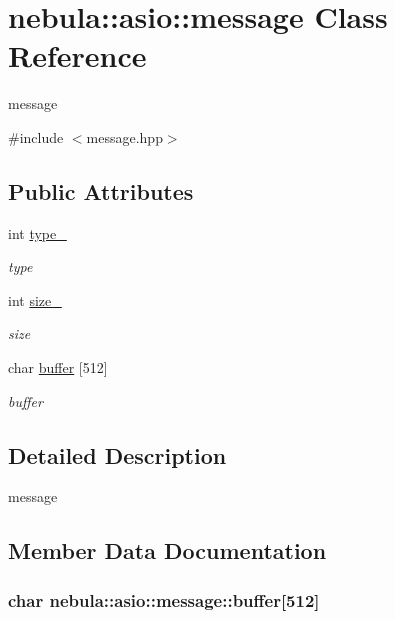 \hypertarget{classnebula_1_1asio_1_1message}{
\section{nebula::asio::message Class Reference}
\label{classnebula_1_1asio_1_1message}
}


message  


{\ttfamily \#include $<$message.hpp$>$}\subsection*{Public Attributes}
\begin{DoxyCompactItemize}
\item 
int \hyperlink{classnebula_1_1asio_1_1message_a3eb27509e00e7825ab9f4c83557725f3}{type\_\-}
\begin{DoxyCompactList}\small\item\em type \item\end{DoxyCompactList}\item 
int \hyperlink{classnebula_1_1asio_1_1message_a9ac3a43a791dc33d15ca5395117080a1}{size\_\-}
\begin{DoxyCompactList}\small\item\em size \item\end{DoxyCompactList}\item 
char \hyperlink{classnebula_1_1asio_1_1message_a7592f88eaf3e851e82d68acba9e8efd2}{buffer} \mbox{[}512\mbox{]}
\begin{DoxyCompactList}\small\item\em buffer \item\end{DoxyCompactList}\end{DoxyCompactItemize}


\subsection{Detailed Description}
message 

\subsection{Member Data Documentation}
\hypertarget{classnebula_1_1asio_1_1message_a7592f88eaf3e851e82d68acba9e8efd2}{
\subsubsection[{buffer}]{\setlength{\rightskip}{0pt plus 5cm}char {\bf nebula::asio::message::buffer}\mbox{[}512\mbox{]}}}
\label{classnebula_1_1asio_1_1message_a7592f88eaf3e851e82d68acba9e8efd2}


